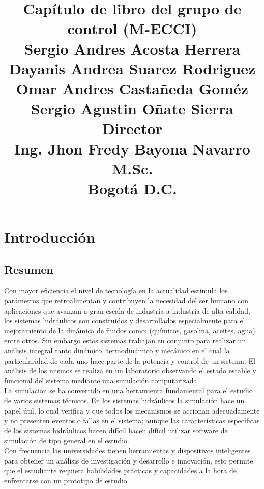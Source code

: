 \documentclass[a4paper,12pt,twoside]{proyectotanquesecci}
\title
{
\textbf{Capítulo de libro del grupo de control (M-ECCI)}\\
\vspace{3cm}
{\large 
Sergio Andres Acosta Herrera \\
Dayanis Andrea Suarez Rodriguez\\
Omar Andres Castañeda Goméz\\
Sergio Agustin Oñate Sierra\\}
\vspace{1cm}
\textbf{Director}\\
{\large Ing. Jhon Fredy Bayona Navarro M.Sc.}\\
\vspace{2cm}
{\large Bogotá D.C.}
}
\begin{document}
\maketitle
\renewcommand{\contentsname}{Tabla de Contenido}
\renewcommand{\listtablename}{Lista de Tablas}
\renewcommand{\listfigurename}{Lista de Figuras}
\tableofcontents
\listoftables
\listoffigures





\chapter{Introducción}

\section{Resumen}

Con mayor eficiencia el nivel de tecnología en la actualidad estimula los parámetros que retroalimentan y contribuyen la necesidad del ser humano con aplicaciones que avanzan a gran escala de industria a industria de alta calidad,  los sistemas hidráulicos son construidos y desarrollados especialmente para el mejoramiento de la dinámica de fluidos como: (químicos, gasolina, aceites, agua)  entre otros. Sin embargo estos sistemas trabajan en conjunto para realizar un análisis integral tanto dinámico, termodinámico y mecánico en el cual la particularidad de cada uno hace parte de la potencia y control de un sistema. El análisis de los mismos se realiza en un laboratorio observando el estado estable y funcional del sistema mediante una simulación computarizada.\\

La simulación se ha convertido en una herramienta fundamental para el estudio de varios sistemas técnicos. En los sistemas hidráulicos la simulación hace un papel útil, lo cual verifica y que todos los mecanismos se accionan adecuadamente y no presenten eventos o fallas en el sistema; aunque las características específicas de los sistemas hidráulicos hacen difícil hacen difícil utilizar software de simulación de tipo general en el estudio.\\

Con frecuencia las universidades tienen herramientas y dispositivos inteligentes para obtener un análisis de investigación y desarrollo e innovación, esto permite que el estudiante requiera habilidades prácticas y capacidades a la hora de enfrentarse con un prototipo de estudio.\\
\end{document}
